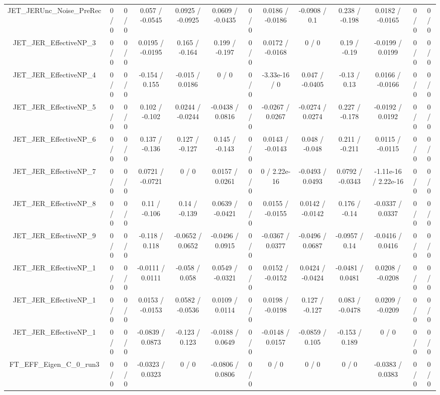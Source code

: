 \documentclass[10pt]{article}
\begin{document}
\begin{table}[htbp]
\begin{center}
\begin{tabular}{|c|c|c|c|c|c|c|c|c|c|c|c|c|}
  JET_JERUnc_Noise_PreRec & 0 / 0 & 0 / 0 & 0.057 / -0.0545 & 0.0925 / -0.0925 & 0.0609 / -0.0435 & 0 / 0 & 0.0186 / -0.0186 & -0.0908 / 0.1 & 0.238 / -0.198 & 0.0182 / -0.0165 & 0 / 0 & 0 / 0 \\ 
  JET_JER_EffectiveNP_3 & 0 / 0 & 0 / 0 & 0.0195 / -0.0195 & 0.165 / -0.164 & 0.199 / -0.197 & 0 / 0 & 0.0172 / -0.0168 & 0 / 0 & 0.19 / -0.19 & -0.0199 / 0.0199 & 0 / 0 & 0 / 0 \\ 
  JET_JER_EffectiveNP_4 & 0 / 0 & 0 / 0 & -0.154 / 0.155 & -0.015 / 0.0186 & 0 / 0 & 0 / 0 & -3.33e-16 / 0 & 0.047 / -0.0405 & -0.13 / 0.13 & 0.0166 / -0.0166 & 0 / 0 & 0 / 0 \\ 
  JET_JER_EffectiveNP_5 & 0 / 0 & 0 / 0 & 0.102 / -0.102 & 0.0244 / -0.0244 & -0.0438 / 0.0816 & 0 / 0 & -0.0267 / 0.0267 & -0.0274 / 0.0274 & 0.227 / -0.178 & -0.0192 / 0.0192 & 0 / 0 & 0 / 0 \\ 
  JET_JER_EffectiveNP_6 & 0 / 0 & 0 / 0 & 0.137 / -0.136 & 0.127 / -0.127 & 0.145 / -0.143 & 0 / 0 & 0.0143 / -0.0143 & 0.048 / -0.048 & 0.211 / -0.211 & 0.0115 / -0.0115 & 0 / 0 & 0 / 0 \\ 
  JET_JER_EffectiveNP_7 & 0 / 0 & 0 / 0 & 0.0721 / -0.0721 & 0 / 0 & 0.0157 / 0.0261 & 0 / 0 & 0 / 2.22e-16 & -0.0493 / 0.0493 & 0.0792 / -0.0343 & -1.11e-16 / 2.22e-16 & 0 / 0 & 0 / 0 \\ 
  JET_JER_EffectiveNP_8 & 0 / 0 & 0 / 0 & 0.11 / -0.106 & 0.14 / -0.139 & 0.0639 / -0.0421 & 0 / 0 & 0.0155 / -0.0155 & 0.0142 / -0.0142 & 0.176 / -0.14 & -0.0337 / 0.0337 & 0 / 0 & 0 / 0 \\ 
  JET_JER_EffectiveNP_9 & 0 / 0 & 0 / 0 & -0.118 / 0.118 & -0.0652 / 0.0652 & -0.0496 / 0.0915 & 0 / 0 & -0.0367 / 0.0377 & -0.0496 / 0.0687 & -0.0957 / 0.14 & -0.0416 / 0.0416 & 0 / 0 & 0 / 0 \\ 
  JET_JER_EffectiveNP_1 & 0 / 0 & 0 / 0 & -0.0111 / 0.0111 & -0.058 / 0.058 & 0.0549 / -0.0321 & 0 / 0 & 0.0152 / -0.0152 & 0.0424 / -0.0424 & -0.0481 / 0.0481 & 0.0208 / -0.0208 & 0 / 0 & 0 / 0 \\ 
  JET_JER_EffectiveNP_1 & 0 / 0 & 0 / 0 & 0.0153 / -0.0153 & 0.0582 / -0.0536 & 0.0109 / 0.0114 & 0 / 0 & 0.0198 / -0.0198 & 0.127 / -0.127 & 0.083 / -0.0478 & 0.0209 / -0.0209 & 0 / 0 & 0 / 0 \\ 
  JET_JER_EffectiveNP_1 & 0 / 0 & 0 / 0 & -0.0839 / 0.0873 & -0.123 / 0.123 & -0.0188 / 0.0649 & 0 / 0 & -0.0148 / 0.0157 & -0.0859 / 0.105 & -0.153 / 0.189 & 0 / 0 & 0 / 0 & 0 / 0 \\ 
  FT_EFF_Eigen_C_0_run3 & 0 / 0 & 0 / 0 & -0.0323 / 0.0323 & 0 / 0 & -0.0806 / 0.0806 & 0 / 0 & 0 / 0 & 0 / 0 & 0 / 0 & -0.0383 / 0.0383 & 0 / 0 & 0 / 0 \\ 

\end{tabular}
\end{center}
\end{table}
\end{document}
